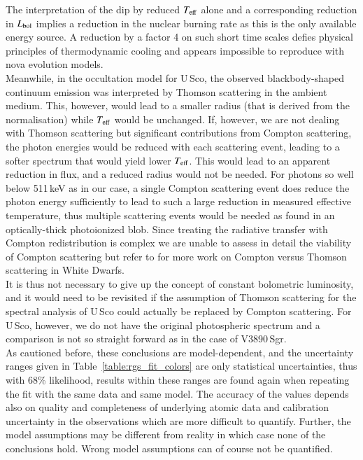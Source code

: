 \documentclass{aa}
\begin{document}
The interpretation of the dip by reduced $T_{\rm eff}$ alone
and a corresponding reduction in $L_{\rm bol}$ implies a reduction in
the nuclear burning rate as this is the only available
energy source. A reduction by a factor 4 on such short time scales
defies physical principles of thermodynamic cooling and appears impossible
to reproduce with nova evolution models.\\

Meanwhile, in the occultation model for U\,Sco, the observed
blackbody-shaped continuum emission was interpreted by Thomson scattering
in the ambient medium. This, however, would lead to a smaller radius
(that is derived from the normalisation) while $T_{\rm eff}$
would be unchanged. If, however, we are not dealing with Thomson
scattering but significant contributions from Compton scattering, the
photon energies would be
reduced with each scattering event, leading to a softer spectrum that
would yield lower $T_{\rm eff}$. This would lead to an
apparent reduction in flux, and a reduced radius would not be needed.
For photons so well below 511\,keV as in our case, a single Compton
scattering event does reduce the photon energy sufficiently to lead to
such a large reduction in measured effective temperature, thus multiple
scattering events would be needed as found in an optically-thick
photoionized blob. Since treating the radiative transfer with Compton
redistribution is complex we are unable to assess in detail the
viability of Compton scattering but refer to \cite{Compton} for more
work on Compton versus Thomson scattering in White Dwarfs.\\

It is thus not necessary to give up the concept of constant bolometric
luminosity, and it would need to be revisited if the assumption of
Thomson scattering for the spectral analysis of U\,Sco could actually
be replaced by Compton scattering. For U\,Sco, however, we do not
have the original photospheric spectrum and a comparison is not so
straight forward as in the case of V3890\,Sgr.\\

As cautioned before, these conclusions are model-dependent, and the uncertainty
ranges given in Table~\ref{table:rgs_fit_colors} are only statistical
uncertainties, thus with 68\% likelihood, results within these ranges are
found again when repeating the fit with the same data and same model. The
accuracy of the values depends also on quality and completeness of
underlying atomic data and calibration uncertainty in the observations
which are more difficult to quantify. Further, the model assumptions
may be different from reality in which case none of the conclusions
hold. Wrong model assumptions can of course not be quantified.\\
\end{document}
